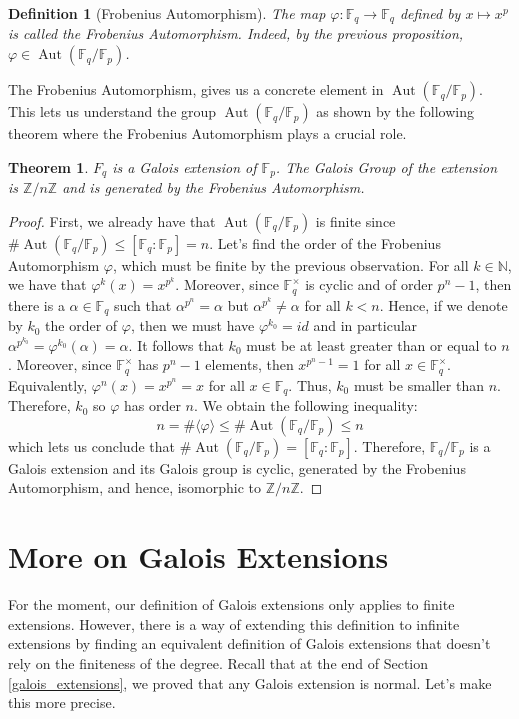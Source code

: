 \documentclass{article}
\newtheorem*{theorem}{Theorem}
\newtheorem*{definition}{Definition}
\newcommand{\N}{\mathbb{N}}
\newcommand{\F}{\mathbb{F}}
\newcommand{\Zn}[1]{\mathbb{Z}/ #1 \mathbb{Z}}
\DeclareMathOperator{\Aut}{\text{Aut}}
\begin{document}
\begin{definition}[Frobenius Automorphism]
    The map $\varphi : \F_q \to \F_q$ defined by $x \mapsto x^p$ is called the Frobenius Automorphism. Indeed, by the previous proposition, $\varphi \in \Aut(\F_q / \F_p)$.
\end{definition}

The Frobenius Automorphism, gives us a concrete element in $\Aut(\F_q / \F_p)$. This lets us understand the group $\Aut(\F_q / \F_p)$ as shown by the following theorem where the Frobenius Automorphism plays a crucial role. 

\begin{theorem}
    $F_q$ is a Galois extension of $\F_p$. The Galois Group of the extension is $\Zn{n}$ and is generated by the Frobenius Automorphism.
\end{theorem}

\begin{proof}
    First, we already have that $\Aut(\F_q / \F_p)$ is finite since $\#\Aut(\F_q / \F_p) \leq [\F_q : \F_p] = n$. Let's find the order of the Frobenius Automorphism $\varphi$, which must be finite by the previous observation. For all $k \in \N$, we have that $\varphi^k(x) = x^{p^k}$. Moreover, since $\F_q^{\times}$ is cyclic and of order $p^n - 1$, then there is a $\alpha \in \F_q$ such that $\alpha^{p^n} = \alpha$ but $\alpha^{p^k} \neq \alpha$ for all $k < n$. Hence, if we denote by $k_0$ the order of $\varphi$, then we must have $\varphi^{k_0} = id$ and in particular $\alpha^{p^{k_0}} = \varphi^{k_0}(\alpha) = \alpha$. It follows that $k_0$ must be at least greater than or equal to $n$. Moreover, since $\F_q^{\times}$ has $p^{n} - 1$ elements, then $x^{p^n - 1} = 1$ for all $x \in \F_q^{\times}$. Equivalently, $\varphi^n(x) = x^{p^n} = x$ for all $x \in \F_q$. Thus, $k_0$ must be smaller than $n$. Therefore, $k_0$ so $\varphi$ has order $n$. We obtain the following inequality:
    $$n = \# \langle \varphi \rangle \leq \# \Aut(\F_q / \F_p) \leq n$$
    which lets us conclude that $\# \Aut(\F_q / \F_p) = [\F_q : \F_p]$. Therefore, $\F_q / \F_p$ is a Galois extension and its Galois group is cyclic, generated by the Frobenius Automorphism, and hence, isomorphic to $\Zn{n}$.
\end{proof}

\section{More on Galois Extensions}

For the moment, our definition of Galois extensions only applies to finite extensions. However, there is a way of extending this definition to infinite extensions by finding an equivalent definition of Galois extensions that doesn't rely on the finiteness of the degree. Recall that at the end of Section \ref{galois_extensions}, we proved that any Galois extension is normal. Let's make this more precise.
\end{document}

